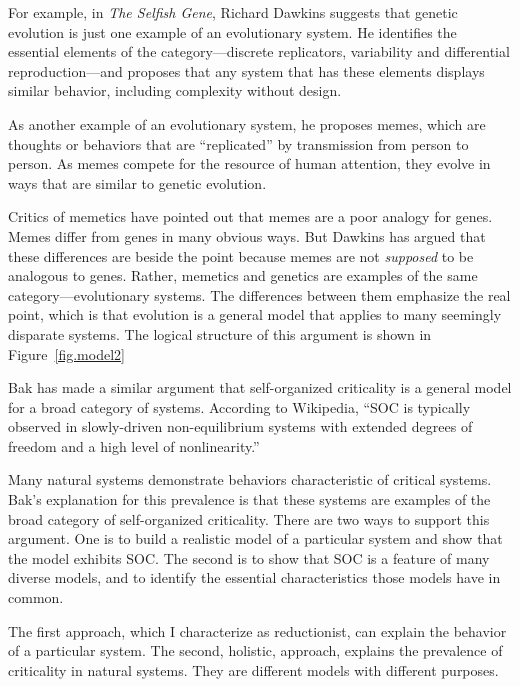 \documentclass[10pt]{book}
\begin{document}
For example, in {\em The Selfish Gene}, Richard Dawkins suggests that
genetic evolution is just one example of an evolutionary system.  He
identifies the essential elements of the category---discrete
replicators, variability and differential reproduction---and proposes
that any system that has these elements displays similar
behavior, including complexity without design.

As another example of an evolutionary system, he proposes memes, which
are thoughts or behaviors that are ``replicated'' by transmission from
person to person.  As memes compete for the resource of human
attention, they evolve in ways that are similar to genetic evolution.

Critics of memetics have pointed out that memes are a poor analogy
for genes.  Memes differ from genes in many obvious ways.  But
Dawkins has argued that these differences are beside the point
because memes are not {\em supposed} to be analogous to genes.
Rather, memetics and genetics are examples of the same
category---evolutionary systems.  The differences between them
emphasize the real point, which is that evolution is a general model
that applies to many seemingly disparate systems.  The logical
structure of this argument is shown in Figure~\ref{fig.model2}

Bak has made a similar argument that self-organized criticality is a
general model for a broad category of systems.  According to
Wikipedia, ``SOC is typically observed in slowly-driven
non-equilibrium systems with extended degrees of freedom and a high
level of nonlinearity.''

Many natural systems demonstrate behaviors characteristic of critical
systems.  Bak's explanation for this prevalence is that these systems
are examples of the broad category of self-organized criticality.
There are two ways to support this argument.  One is to build
a realistic model of a particular system and show that the model
exhibits SOC.  The second is to show that SOC is a feature of many
diverse models, and to identify the essential characteristics
those models have in common.

The first approach, which I characterize as reductionist,
can explain the behavior of a particular system.  The
second, holistic, approach, explains the prevalence of
criticality in natural systems.  They are different models
with different purposes.
\end{document}
